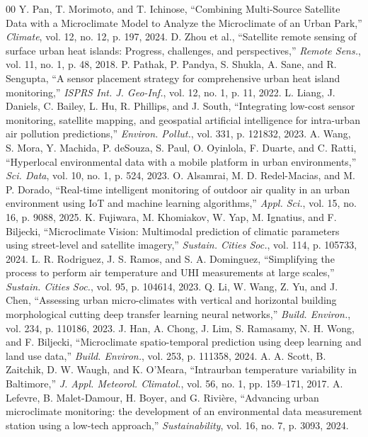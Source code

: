 \documentclass[conference]{IEEEtran}
\begin{document}
\begin{thebibliography}{00}
 Y. Pan, T. Morimoto, and T. Ichinose, ``Combining Multi-Source Satellite Data with a Microclimate Model to Analyze the Microclimate of an Urban Park,'' \textit{Climate}, vol. 12, no. 12, p. 197, 2024.
 D. Zhou et al., ``Satellite remote sensing of surface urban heat islands: Progress, challenges, and perspectives,'' \textit{Remote Sens.}, vol. 11, no. 1, p. 48, 2018.
 P. Pathak, P. Pandya, S. Shukla, A. Sane, and R. Sengupta, ``A sensor placement strategy for comprehensive urban heat island monitoring,'' \textit{ISPRS Int. J. Geo-Inf.}, vol. 12, no. 1, p. 11, 2022.
 L. Liang, J. Daniels, C. Bailey, L. Hu, R. Phillips, and J. South, ``Integrating low-cost sensor monitoring, satellite mapping, and geospatial artificial intelligence for intra-urban air pollution predictions,'' \textit{Environ. Pollut.}, vol. 331, p. 121832, 2023.
 A. Wang, S. Mora, Y. Machida, P. deSouza, S. Paul, O. Oyinlola, F. Duarte, and C. Ratti, ``Hyperlocal environmental data with a mobile platform in urban environments,'' \textit{Sci. Data}, vol. 10, no. 1, p. 524, 2023.
 O. Alsamrai, M. D. Redel-Macias, and M. P. Dorado, ``Real-time intelligent monitoring of outdoor air quality in an urban environment using IoT and machine learning algorithms,'' \textit{Appl. Sci.}, vol. 15, no. 16, p. 9088, 2025.
 K. Fujiwara, M. Khomiakov, W. Yap, M. Ignatius, and F. Biljecki, ``Microclimate Vision: Multimodal prediction of climatic parameters using street-level and satellite imagery,'' \textit{Sustain. Cities Soc.}, vol. 114, p. 105733, 2024.
 L. R. Rodriguez, J. S. Ramos, and S. A. Dominguez, ``Simplifying the process to perform air temperature and UHI measurements at large scales,'' \textit{Sustain. Cities Soc.}, vol. 95, p. 104614, 2023.
 Q. Li, W. Wang, Z. Yu, and J. Chen, ``Assessing urban micro-climates with vertical and horizontal building morphological cutting deep transfer learning neural networks,'' \textit{Build. Environ.}, vol. 234, p. 110186, 2023.
 J. Han, A. Chong, J. Lim, S. Ramasamy, N. H. Wong, and F. Biljecki, ``Microclimate spatio-temporal prediction using deep learning and land use data,'' \textit{Build. Environ.}, vol. 253, p. 111358, 2024.
 A. A. Scott, B. Zaitchik, D. W. Waugh, and K. O'Meara, ``Intraurban temperature variability in Baltimore,'' \textit{J. Appl. Meteorol. Climatol.}, vol. 56, no. 1, pp. 159--171, 2017.
 A. Lefevre, B. Malet-Damour, H. Boyer, and G. Rivi\`{e}re, ``Advancing urban microclimate monitoring: the development of an environmental data measurement station using a low-tech approach,'' \textit{Sustainability}, vol. 16, no. 7, p. 3093, 2024.

\end{thebibliography}
\end{document}
